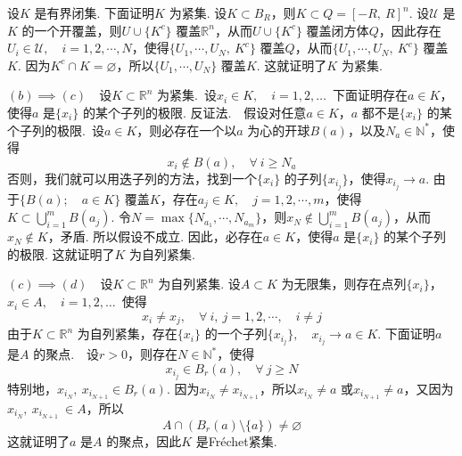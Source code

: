\documentclass{article}
\begin{document}
\vspace{10pt}

设\(K\) 是有界闭集. 下面证明\(K\) 为紧集. 设\(K \subset B_R\)，则\(K \subset Q =[ - R,\ R]^{n}\). 设\(\mathcal{U}\) 是\(K\) 的一个开覆盖，则\(U \cup \{K^c\} \) 覆盖\(\mathbb{R}^n\)，从而\(U \cup \{K^c\} \) 覆盖闭方体\(Q\)，因此存在\(U_i \in \mathcal{U},\quad i = 1,2,\cdots ,N\)，使得\(\{U_1,\cdots,U_N,\ K^{c} \} \) 覆盖\(Q\)，从而\(\{U_1,\cdots ,U_N,\ K^{c} \}\) 覆盖\(K\). 因为\(K^{c} \cap K = \varnothing \)，所以\(\{U_1,\cdots,U_{N}\}\) 覆盖\(K\). 这就证明了\(K\) 为紧集.

\newpage

\((b) \implies (c)\)\ \ 设\(K \subset \mathbb{R}^n\) 为紧集.\ 设\(x_i \in K,\quad i = 1,2,\dots \)\ 下面证明存在\(a \in K\)，使得\(a\) 是\(\{x_i\} \) 的某个子列的极限. 反证法.\ \ 假设对任意\(a \in K\)，\(a\) 都不是\(\{x_i\} \) 的某个子列的极限.\ 设\(a \in K\)，则必存在一个以\(a\) 为心的开球\(B(a)\)，以及\(N_a \in \mathbb{N}^{*}\)，使得
\begin{equation*}
    x_i \notin B(a),\quad \forall\ i \ge N_a
\end{equation*}
否则，我们就可以用迭子列的方法，找到一个\(\{x_i\} \) 的子列\(\{x_{i_j}\}\)，使得\(x_{i_j}\to a\). 由于\(\{B(a);\quad a \in K\} \) 覆盖\(K\)，存在\(a_j \in K,\quad j = 1,2,\cdots,m \)，使得\(K \subset \bigcup_{i = 1}^{m}B(a_{j})\). 令\(N = \max \{N_{a_1},\cdots,N_{a_m}\} \)，则\(x_{N} \notin \bigcup_{i = 1}^{m}B(a_j)\)，从而\(x_N \notin K\)，矛盾. 所以假设不成立. 因此，必存在\(a \in K\)，使得\(a\) 是\(\{x_i\} \) 的某个子列的极限. 这就证明了\(K\) 为自列紧集.

\newpage

\((c) \implies (d)\)\ \ 设\(K \subset \mathbb{R}^n\) 为自列紧集. 设\(A \subset K\) 为无限集，则存在点列\(\{x_i\}\)，\(x_i \in A,\quad i = 1,2,\dots \)\ 使得
\begin{equation*}
    x_i \neq x_j,\quad \forall\ i,\ j = 1,2,\cdots, \quad i \neq j
\end{equation*}
由于\(K \subset \mathbb{R}^n\) 为自列紧集，存在\(\{x_i\} \) 的一个子列\(\{x_{i_j}\},\quad x_{i_j}\to a \in K\).\newline
下面证明\(a\) 是\(A\) 的聚点.\ \ 设\(r > 0\)，则存在\(N \in \mathbb{N}^{*}\)，使得
\begin{equation*}
    x_{i_j} \in B_r(a),\quad \forall\ j \ge N
\end{equation*}
特别地，\(x_{i_N},\ x_{i_{N + 1}}\in B_r(a)\). 因为\(x_{i_N} \neq x_{i_{N + 1}}\)，所以\(x_{i_N} \neq a\) 或\(x_{i_{N + 1}} \neq a\)，又因为\(x_{i_N},\ x_{i_{N + 1}}\ \in A\)，所以
\begin{equation*}
    A \cap \left(B_r(a)\setminus \{a\} \right) \neq \varnothing
\end{equation*}
这就证明了\(a\) 是\(A\) 的聚点，因此\(K\) 是Fréchet紧集.
\end{document}
